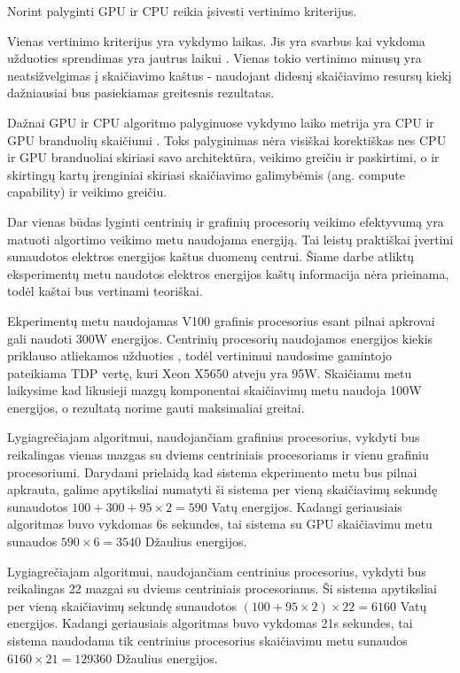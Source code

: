 \documentclass{VUMIFPSbakalaurinis}
\begin{document}
Norint palyginti GPU ir CPU reikia įsivesti vertinimo kriterijus.

Vienas vertinimo kriterijus yra vykdymo laikas.
Jis yra svarbus kai vykdoma užduoties sprendimas yra jautrus laikui \cite{yang2019re}. 
Vienas tokio vertinimo minusų yra neatsižvelgimas į skaičiavimo kaštus - naudojant didesnį skaičiavimo resursų kiekį dažniausiai bus pasiekiamas greitesnis rezultatas.

Dažnai GPU ir CPU algoritmo palyginuose vykdymo laiko metrija yra CPU ir GPU branduolių skaičiumi \cite{garland2008parallel, belhaous2021comparative}.
Toks palyginimas nėra visiškai korektiškas nes CPU ir GPU branduoliai skiriasi savo architektūra, veikimo greičiu ir paskirtimi, o ir skirtingų kartų įrenginiai skiriasi skaičiavimo galimybėmis (ang. compute capability) ir veikimo greičiu.

Dar vienas būdas lyginti centrinių ir grafinių procesorių veikimo efektyvumą yra matuoti algortimo veikimo metu naudojama energiją.
Tai leistų praktiškai įvertini sunaudotos elektros energijos kaštus duomenų centrui. 
Šiame darbe atliktų eksperimentų metu naudotos elektros energijos kaštų informacija nėra prieinama, todėl kaštai bus vertinami teoriškai.

Ekperimentų metu naudojamas V100 grafinis procesorius esant pilnai apkrovai gali naudoti 300W energijos.
Centrinių procesorių naudojamos energijos kiekis priklauso atliekamos užduoties \cite{von2016variations}, todėl vertinimui naudosime gamintojo pateikiama TDP vertę, kuri Xeon X5650 atveju yra 95W.
Skaičiamu metu laikysime kad likusieji mazgų komponentai skaičiavimų metu naudoja 100W energijos, o rezultatą norime gauti maksimaliai greitai.

Lygiagrečiajam algoritmui, naudojančiam grafinius procesorius, vykdyti bus reikalingas vienas mazgas su dviems centriniais procesoriams ir vienu grafiniu procesoriumi.
Darydami prielaidą kad sistema ekperimento metu bus pilnai apkrauta, galime apytiksliai numatyti ši sistema per vieną skaičiavimų sekundę sunaudotos $100+300+95\times2 = 590$ Vatų energijos.
Kadangi geriausiais algoritmas buvo vykdomas 6s sekundes, tai sistema su GPU skaičiavimu metu sunaudos $590\times6 = 3540$ Džaulius energijos.

Lygiagrečiajam algoritmui, naudojančiam centrinius procesorius, vykdyti bus reikalingas 22 mazgai su dviems centriniais procesoriams.
Ši sistema apytiksliai per vieną skaičiavimų sekundę sunaudotos $(100+95\times2)\times22 = 6160$ Vatų energijos.
Kadangi geriausiais algoritmas buvo vykdomas 21s sekundes, tai sistema naudodama tik centrinius procesorius skaičiavimu metu sunaudos $6160\times21 = 129360$ Džaulius energijos.
\end{document}
